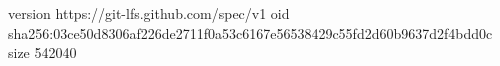 version https://git-lfs.github.com/spec/v1
oid sha256:03ce50d8306af226de2711f0a53c6167e56538429c55fd2d60b9637d2f4bdd0c
size 542040
